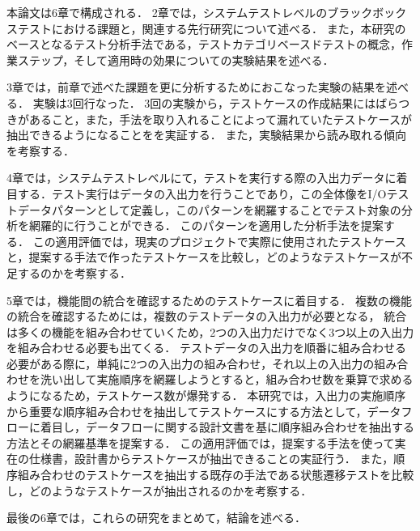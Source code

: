本論文は6章で構成される．
2章では，システムテストレベルのブラックボックステストにおける課題と，関連する先行研究について述べる．
また，本研究のベースとなるテスト分析手法である，テストカテゴリベースドテストの概念，作業ステップ，そして適用時の効果についての実験結果を述べる．

3章では，前章で述べた課題を更に分析するためにおこなった実験の結果を述べる．
実験は3回行なった．
3回の実験から，テストケースの作成結果にはばらつきがあること，また，手法を取り入れることによって漏れていたテストケースが抽出できるようになることをを実証する．
また，実験結果から読み取れる傾向を考察する．

4章では，システムテストレベルにて，テストを実行する際の入出力データに着目する．テスト実行はデータの入出力を行うことであり，この全体像をI/Oテストデータパターンとして定義し，このパターンを網羅することでテスト対象の分析を網羅的に行うことができる．
このパターンを適用した分析手法を提案する．
この適用評価では，現実のプロジェクトで実際に使用されたテストケースと，提案する手法で作ったテストケースを比較し，どのようなテストケースが不足するのかを考察する．

5章では，機能間の統合を確認するためのテストケースに着目する．
複数の機能の統合を確認するためには，複数のテストデータの入出力が必要となる，
統合は多くの機能を組み合わせていくため，2つの入出力だけでなく3つ以上の入出力を組み合わせる必要も出てくる．
テストデータの入出力を順番に組み合わせる必要がある際に，単純に2つの入出力の組み合わせ，それ以上の入出力の組み合わせを洗い出して実施順序を網羅しようとすると，組み合わせ数を乗算で求めるようになるため，テストケース数が爆発する．
本研究では，入出力の実施順序から重要な順序組み合わせを抽出してテストケースにする方法として，データフローに着目し，データフローに関する設計文書を基に順序組み合わせを抽出する方法とその網羅基準を提案する．
この適用評価では，提案する手法を使って実在の仕様書，設計書からテストケースが抽出できることの実証行う．
また，順序組み合わせのテストケースを抽出する既存の手法である状態遷移テストを比較し，どのようなテストケースが抽出されるのかを考察する．

最後の6章では，これらの研究をまとめて，結論を述べる．
